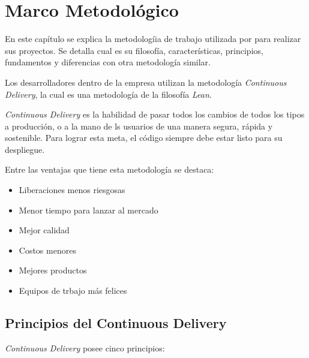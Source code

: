 \chapter{Marco Metodológico}

En este capítulo se explica la metodologíia de trabajo utilizada por \business para realizar sus proyectos. Se detalla cual es su filosofía, características, principios, fundamentos y diferencias con otra metodología similar.

Los desarrolladores dentro de la empresa utilizan la metodología \textit{Continuous Delivery}, la cual es una metodología de la filosofía \textit{Lean}.

\textit{Continuous Delivery} es la habilidad de pasar todos los cambios de todos los tipos a producción, o a la mano de ls usuarios de una manera segura, rápida y sostenible. Para lograr esta meta, el código siempre debe estar listo para su despliegue.

Entre las ventajas que tiene esta metodología se destaca:

\begin{itemize}
    \item Liberaciones menos riesgosas
    \item Menor tiempo para lanzar al mercado
    \item Mejor calidad
    \item Costos menores
    \item Mejores productos
    \item Equipos de trbajo más felices
\end{itemize}

\section{Principios del Continuous Delivery}

\textit{Continuous Delivery} posee cinco principios:

